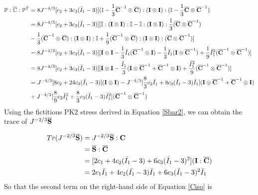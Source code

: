 \begin{equation} \label{part12}
\begin{split}
\mathbb{P} : \overline{\mathbb{C}} : {\mathbb{P}}^T 
&= 8J^{-4/3}[c_2 + 3c_3({\bar{I}}_1 - 3 )](\mathbb{I} - \frac{1}{3}{\overline{\bold{C}}}^{-1} \otimes {\overline{\bold{C}}}) : (\bold{I} \otimes \bold{I}): (\mathbb{I} - \frac{1}{3}{\overline{\bold{C}}} \otimes {\overline{\bold{C}}}^{-1}) \\
&= 8J^{-4/3}[c_2 + 3c_3({\bar{I}}_1 - 3 )][\mathbb{I}:(\bold{I} \otimes \bold{I}):\mathbb{I} - \mathbb{I}:(\bold{I} \otimes \bold{I}): \frac{1}{3} ({\overline{\bold{C}}} \otimes {\overline{\bold{C}}}^{-1}) \\
&- \frac{1}{3} ({\overline{\bold{C}}}^{-1} \otimes {\overline{\bold{C}}}) : (\bold{I} \otimes \bold{I}) : \mathbb{I} +  \frac{1}{9} ({\overline{\bold{C}}}^{-1} \otimes {\overline{\bold{C}}}) : (\bold{I} \otimes \bold{I}) : ({\overline{\bold{C}}} \otimes {\overline{\bold{C}}}^{-1}) ] \\
&= 8J^{-4/3}[c_2 + 3c_3({\bar{I}}_1 - 3 )][ \bold{I} \otimes \bold{I} - \frac{1}{3}\bar{I}_1({\overline{\bold{C}}}^{-1} \otimes \bold{I}) - \frac{1}{3}\bar{I}_1 (\bold{I} \otimes {\overline{\bold{C}}}^{-1}) + \frac{1}{9}{\bar{I}_1}^2({\overline{\bold{C}}}^{-1} \otimes {\overline{\bold{C}}}^{-1})] \\
&= 8J^{-4/3}[c_2 + 3c_3({\bar{I}}_1 - 3 )] [\bold{I} \otimes \bold{I} - \frac{{\bar{I}}_1}{3}(\bold{I} \otimes {\overline{\bold{C}}}^{-1} +{\overline{\bold{C}}}^{-1}  \otimes  \bold{I}) + \frac{{{\bar{I}}_1}^2}{9} ({\overline{\bold{C}}}^{-1} \otimes {\overline{\bold{C}}}^{-1}) ] \\
&=  J^{-4/3}[8c_2 + 24c_3({\bar{I}}_1 - 3 )] (\bold{I} \otimes \bold{I} ) -  J^{-4/3}[\frac{8}{3}c_2{\bar{I}}_1 + 8c_3({\bar{I}}_1 - 3 ){\bar{I}}_1] (\bold{I} \otimes {\overline{\bold{C}}}^{-1} +{\overline{\bold{C}}}^{-1}  \otimes  \bold{I}) \\
&+
J^{-4/3}[\frac{8}{9}c_2{\bar{I}_1}^2 + \frac{8}{3}c_3({\bar{I}}_1 - 3 ){\bar{I}_1}^2] ({\overline{\bold{C}}}^{-1} \otimes {\overline{\bold{C}}}^{-1})
\end{split}
\end{equation}
Using the fictitious PK2 stress derived in Equation \ref{Sbar2}, we can obtain the trace of $J^{-2/3}\overline{\bold{S}}$

\begin{equation}
\begin{split}
Tr(J^{-2/3}\overline{\bold{S}}) &= J^{-2/3}\overline{\bold{S}}:\bold{C} \\
&= \overline{\bold{S}} : \overline{\bold{C}} \\
&=  [2c_1 + 4c_2(\bar{I}_1 - 3) + 6c_3(\bar{I}_1 - 3)^2] (\bold{I} : \overline{\bold{C}}) \\
&= 2c_1\bar{I}_1 + 4c_2(\bar{I_1} - 3)\bar{I}_1 + 6c_3(\bar{I}_1 - 3)^2\bar{I}_1
\end{split}
\end{equation}
So that the second term on the right-hand side of Equation \ref{Ciso} is

